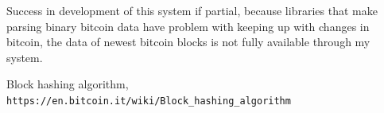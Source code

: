 \documentclass[12pt, en, eng, oneside]{mgr}
\begin{document}
Success in development of this system if partial, because libraries that make parsing binary bitcoin data have problem with keeping up with changes in bitcoin, the data of newest bitcoin blocks is not fully available through my system.    
   

\begin{thebibliography}{9}
 
Block hashing algorithm,
\\\texttt{https://en.bitcoin.it/wiki/Block\_hashing\_algorithm}
\end{thebibliography}
\end{document}
